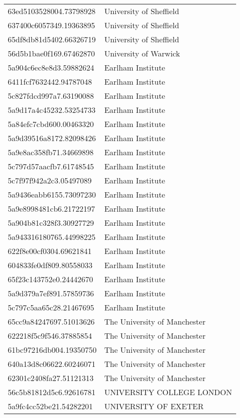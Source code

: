 \begin{tabular}{ll}
63ed5103528004.73798928 & University of Sheffield \\
637400c6057349.19363895 & University of Sheffield \\
65df8db81d5402.66326719 & University of Sheffield \\
56d5b1bae0f169.67462870 & University of Warwick \\
5a904c6ec8e8d3.59882624 & Earlham Institute \\
6411fcf7632442.94787048 & Earlham Institute \\
5c827fdcd997a7.63190088 & Earlham Institute \\
5a9d17a4c45232.53254733 & Earlham Institute \\
5a84efc7cbd600.00463320 & Earlham Institute \\
5a9d39516a8172.82098426 & Earlham Institute \\
5a9e8ac358fb71.34669898 & Earlham Institute \\
5c797d57aacfb7.61748545 & Earlham Institute \\
5c7f97f942a2c3.05497089 & Earlham Institute \\
5a9436eabb6155.73097230 & Earlham Institute \\
5a9e8998481cb6.21722197 & Earlham Institute \\
5a904b81c328f3.30927729 & Earlham Institute \\
5a943316180765.44998225 & Earlham Institute \\
622f8e00cf0304.69621841 & Earlham Institute \\
604833fe0df809.80558033 & Earlham Institute \\
65f23c143752e0.24442670 & Earlham Institute \\
5a9d379a7ef891.57859736 & Earlham Institute \\
5c797c5aa65c28.21467695 & Earlham Institute \\
65cc9a84247697.51013626 & The University of Manchester \\
622218f5c9f546.37885854 & The University of Manchester \\
61bc97216db004.19350750 & The University of Manchester \\
640a13d8c06622.60246071 & The University of Manchester \\
62301c2408fa27.51121313 & The University of Manchester \\
56c5b81812d5c6.92616781 & UNIVERSITY COLLEGE LONDON \\
5a9fc4cc52be21.54282201 & UNIVERSITY OF EXETER \\

\end{tabular}
